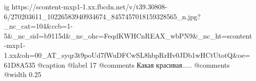 
 
 
 
 

\ifcmt
  ig https://scontent-mxp1-1.xx.fbcdn.net/v/t39.30808-6/270203611_10226583940934674_8457457018159328565_n.jpg?_nc_cat=104&ccb=1-5&_nc_sid=b9115d&_nc_ohc=FeqdKWHCnREAX_wbPN9&_nc_ht=scontent-mxp1-1.xx&oh=00_AT_syqr3t9poUd7fWuDFCwSL8hbpRrHv0JDb1wHCtUtotQ&oe=61D8A535
	@caption @label 17
	@comments%
    Какая красивая.....
	@comments%
  @width 0.25
\fi
